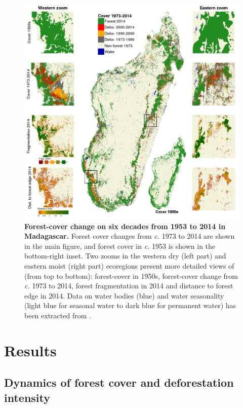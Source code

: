 \documentclass[essd, classical]{copernicus}
\begin{document}
\begin{figure}[h]
  \centering
  
  \includegraphics[width=\textwidth]{fig_fcc_highres.png}
  
  \caption{\textbf{Forest-cover change on six decades from 1953
      to 2014 in Madagascar.} Forest cover changes from \emph{c.} 1973 to 2014
    are shown in the main figure, and forest cover in \emph{c.} 1953 is
    shown in the bottom-right inset. Two zooms in the western dry (left
    part) and eastern moist (right part) ecoregions present more detailed
    views of (from top to bottom): forest-cover in 1950s, forest-cover
    change from \emph{c.} 1973 to 2014, forest fragmentation in 2014 and
    distance to forest edge in 2014. Data on water bodies (blue) and water
    seasonality (light blue for seasonal water to dark blue for permanent
    water) has been extracted from \citet{Pekel2016}.}

  \label{fig:fcc}

\end{figure}

\section{Results}
\label{results}

\subsection{Dynamics of forest cover and deforestation
intensity}
\end{document}
